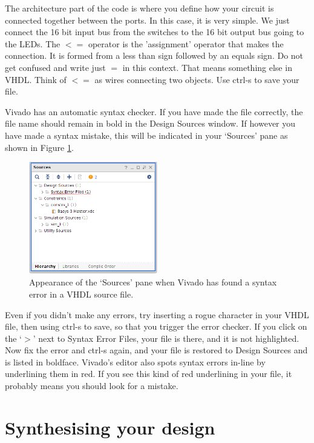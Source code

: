 \documentclass[../physical_computing.tex]{subfiles}
\begin{document}
The architecture part of the code is where you define how your circuit is connected together between the ports. In this case, it is very simple. We just connect the 16 bit input bus from the switches to the 16 bit output bus going to the LEDs. The $<=$ operator is the 'assignment' operator that makes the connection. It is formed from a less than sign followed by an equals sign. Do not get confused and write just $=$ in this context. That means something else in VHDL. Think of $<=$ as wires connecting two objects. Use ctrl-s to save your file.

Vivado has an automatic syntax checker. If you have made the file correctly, the file name should remain in bold in the Design Sources window. If however you have made a syntax mistake, this will be indicated in your `Sources' pane as shown in Figure \ref{fig:syntaxerror}.

\begin{figure}[htbp]
    \centering
    \includegraphics[width=0.5\textwidth]{figures/syntax_error.png}
    \caption{Appearance of the `Sources' pane when Vivado has found a syntax error in a VHDL source file.}
    \label{fig:syntaxerror}
\end{figure}

Even if you didn't make any errors, try inserting a rogue character in your VHDL file, then using ctrl-s to save, so that you trigger the error checker. If you click on the `$>$' next to Syntax Error Files, your file is there, and it is not highlighted. Now fix the error and ctrl-s again, and your file is restored to Design Sources and is listed in boldface. Vivado's editor also spots syntax errors in-line by underlining them in red. If you see this kind of red underlining in your file, it probably means you should look for a mistake.

\section{Synthesising your design}
\label{sec:synthesis}
\end{document}
